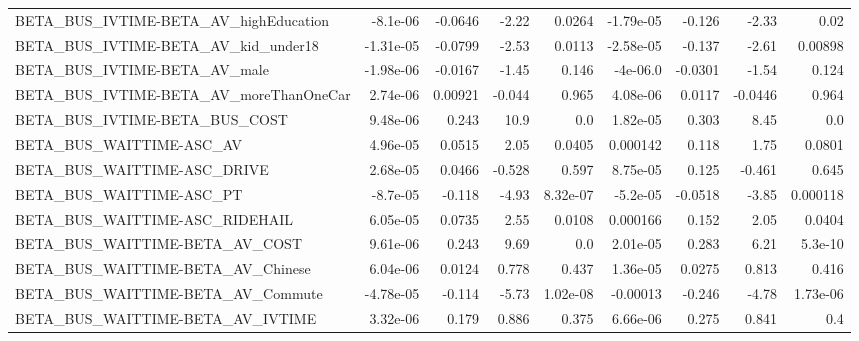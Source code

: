 \begin{tabular}{lrrrrrrrr}
BETA\_BUS\_IVTIME-BETA\_AV\_highEducation              &    -8.1e-06 &      -0.0646 &    -2.22 &   0.0264 &  -1.79e-05 &      -0.126 &        -2.33 &          0.02 \\
BETA\_BUS\_IVTIME-BETA\_AV\_kid\_under18                &   -1.31e-05 &      -0.0799 &    -2.53 &   0.0113 &  -2.58e-05 &      -0.137 &        -2.61 &       0.00898 \\
BETA\_BUS\_IVTIME-BETA\_AV\_male                       &   -1.98e-06 &      -0.0167 &    -1.45 &    0.146 &   -4e-06.0 &     -0.0301 &        -1.54 &         0.124 \\
BETA\_BUS\_IVTIME-BETA\_AV\_moreThanOneCar             &    2.74e-06 &      0.00921 &   -0.044 &    0.965 &   4.08e-06 &      0.0117 &      -0.0446 &         0.964 \\
BETA\_BUS\_IVTIME-BETA\_BUS\_COST                      &    9.48e-06 &        0.243 &     10.9 &      0.0 &   1.82e-05 &       0.303 &         8.45 &           0.0 \\
BETA\_BUS\_WAITTIME-ASC\_AV                           &    4.96e-05 &       0.0515 &     2.05 &   0.0405 &   0.000142 &       0.118 &         1.75 &        0.0801 \\
BETA\_BUS\_WAITTIME-ASC\_DRIVE                        &    2.68e-05 &       0.0466 &   -0.528 &    0.597 &   8.75e-05 &       0.125 &       -0.461 &         0.645 \\
BETA\_BUS\_WAITTIME-ASC\_PT                           &    -8.7e-05 &       -0.118 &    -4.93 & 8.32e-07 &   -5.2e-05 &     -0.0518 &        -3.85 &      0.000118 \\
BETA\_BUS\_WAITTIME-ASC\_RIDEHAIL                     &    6.05e-05 &       0.0735 &     2.55 &   0.0108 &   0.000166 &       0.152 &         2.05 &        0.0404 \\
BETA\_BUS\_WAITTIME-BETA\_AV\_COST                     &    9.61e-06 &        0.243 &     9.69 &      0.0 &   2.01e-05 &       0.283 &         6.21 &       5.3e-10 \\
BETA\_BUS\_WAITTIME-BETA\_AV\_Chinese                  &    6.04e-06 &       0.0124 &    0.778 &    0.437 &   1.36e-05 &      0.0275 &        0.813 &         0.416 \\
BETA\_BUS\_WAITTIME-BETA\_AV\_Commute                  &   -4.78e-05 &       -0.114 &    -5.73 & 1.02e-08 &   -0.00013 &      -0.246 &        -4.78 &      1.73e-06 \\
BETA\_BUS\_WAITTIME-BETA\_AV\_IVTIME                   &    3.32e-06 &        0.179 &    0.886 &    0.375 &   6.66e-06 &       0.275 &        0.841 &           0.4 \\

\end{tabular}

